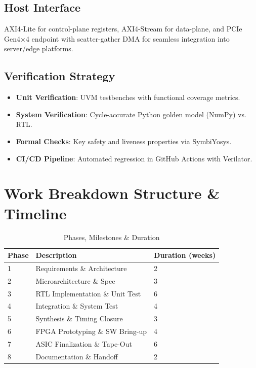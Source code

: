 \documentclass[10pt,twocolumn]{article}
\begin{document}
\subsection*{Host Interface}
AXI4-Lite for control-plane registers, AXI4-Stream for data-plane, and PCIe Gen4×4 endpoint with scatter-gather DMA for seamless integration into server/edge platforms.

\subsection*{Verification Strategy}
\begin{itemize}
  \item \textbf{Unit Verification}: UVM testbenches with functional coverage metrics.
  \item \textbf{System Verification}: Cycle-accurate Python golden model (NumPy) vs. RTL.
  \item \textbf{Formal Checks}: Key safety and liveness properties via SymbiYosys.
  \item \textbf{CI/CD Pipeline}: Automated regression in GitHub Actions with Verilator.
\end{itemize}

\section{Work Breakdown Structure \& Timeline}
\begin{table}[ht]
  \centering
  \caption{Phases, Milestones \& Duration}
  \begin{tabular}{@{}lll@{}}
    \toprule
    Phase & Description & Duration (weeks) \\
    \midrule
    1 & Requirements \& Architecture   & 2 \\
    2 & Microarchitecture \& Spec       & 3 \\
    3 & RTL Implementation \& Unit Test & 6 \\
    4 & Integration \& System Test      & 4 \\
    5 & Synthesis \& Timing Closure     & 3 \\
    6 & FPGA Prototyping \& SW Bring-up & 4 \\
    7 & ASIC Finalization \& Tape-Out   & 6 \\
    8 & Documentation \& Handoff        & 2 \\
    \bottomrule
  \end{tabular}
  \label{tab:timeline}
\end{table}
\end{document}
